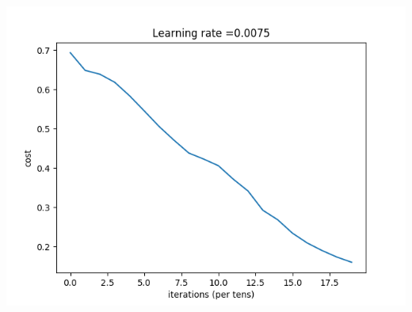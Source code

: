 \documentclass[12pt,a4paper]{article}
\begin{document}
		\includegraphics[scale=0.8]{Figure_1.png}
\end{document}

